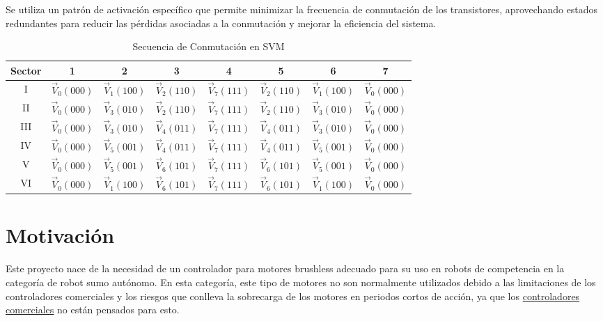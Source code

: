 \documentclass[11pt]{report}
\begin{document}
Se utiliza un patrón de activación específico que permite minimizar la frecuencia de conmutación de los transistores, aprovechando estados redundantes para reducir las pérdidas asociadas a la conmutación y mejorar la eficiencia del sistema. \cite{power_conv_06}

\begin{table}[htbp]
	\centering
	\caption{Secuencia de Conmutación en SVM}
	\begin{tabular}{ c c c c c c c c }
		\hline
		\textbf{Sector} & \textbf{1}       & \textbf{2}       & \textbf{3}       & \textbf{4}       & \textbf{5}       & \textbf{6}       & \textbf{7}       \\
		\hline
		I               & $\vec{V}_0(000)$ & $\vec{V}_1(100)$ & $\vec{V}_2(110)$ & $\vec{V}_7(111)$ & $\vec{V}_2(110)$ & $\vec{V}_1(100)$ & $\vec{V}_0(000)$ \\
		II              & $\vec{V}_0(000)$ & $\vec{V}_3(010)$ & $\vec{V}_2(110)$ & $\vec{V}_7(111)$ & $\vec{V}_2(110)$ & $\vec{V}_3(010)$ & $\vec{V}_0(000)$ \\
		III             & $\vec{V}_0(000)$ & $\vec{V}_3(010)$ & $\vec{V}_4(011)$ & $\vec{V}_7(111)$ & $\vec{V}_4(011)$ & $\vec{V}_3(010)$ & $\vec{V}_0(000)$ \\
		IV              & $\vec{V}_0(000)$ & $\vec{V}_5(001)$ & $\vec{V}_4(011)$ & $\vec{V}_7(111)$ & $\vec{V}_4(011)$ & $\vec{V}_5(001)$ & $\vec{V}_0(000)$ \\
		V               & $\vec{V}_0(000)$ & $\vec{V}_5(001)$ & $\vec{V}_6(101)$ & $\vec{V}_7(111)$ & $\vec{V}_6(101)$ & $\vec{V}_5(001)$ & $\vec{V}_0(000)$ \\
		VI              & $\vec{V}_0(000)$ & $\vec{V}_1(100)$ & $\vec{V}_6(101)$ & $\vec{V}_7(111)$ & $\vec{V}_6(101)$ & $\vec{V}_1(100)$ & $\vec{V}_0(000)$ \\
		\hline
	\end{tabular}
\end{table}

\newpage
\section{Motivación}
Este proyecto nace de la necesidad de un controlador para motores brushless adecuado para su uso en robots de competencia en la categoría de robot sumo autónomo. En esta categoría, este tipo de motores no son normalmente utilizados debido a las limitaciones de los controladores comerciales y los riesgos que conlleva la sobrecarga de los motores en periodos cortos de acción, ya que los \href{https://www.youtube.com/watch?v=SmDZmGU08BM}{controladores comerciales} no están pensados para esto.
\end{document}
